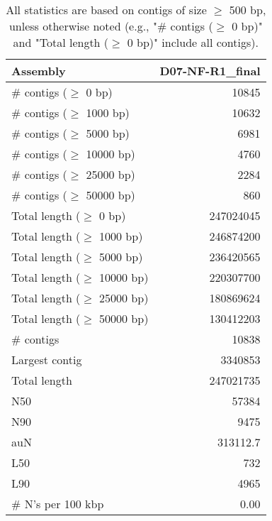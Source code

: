 \documentclass[12pt,a4paper]{article}
\begin{document}
\begin{table}[ht]
\begin{center}
\caption{All statistics are based on contigs of size $\geq$ 500 bp, unless otherwise noted (e.g., "\# contigs ($\geq$ 0 bp)" and "Total length ($\geq$ 0 bp)" include all contigs).}
\begin{tabular}{|l*{1}{|r}|}
\hline
Assembly & D07-NF-R1\_final \\ \hline
\# contigs ($\geq$ 0 bp) & 10845 \\ \hline
\# contigs ($\geq$ 1000 bp) & 10632 \\ \hline
\# contigs ($\geq$ 5000 bp) & 6981 \\ \hline
\# contigs ($\geq$ 10000 bp) & 4760 \\ \hline
\# contigs ($\geq$ 25000 bp) & 2284 \\ \hline
\# contigs ($\geq$ 50000 bp) & 860 \\ \hline
Total length ($\geq$ 0 bp) & 247024045 \\ \hline
Total length ($\geq$ 1000 bp) & 246874200 \\ \hline
Total length ($\geq$ 5000 bp) & 236420565 \\ \hline
Total length ($\geq$ 10000 bp) & 220307700 \\ \hline
Total length ($\geq$ 25000 bp) & 180869624 \\ \hline
Total length ($\geq$ 50000 bp) & 130412203 \\ \hline
\# contigs & 10838 \\ \hline
Largest contig & 3340853 \\ \hline
Total length & 247021735 \\ \hline
N50 & 57384 \\ \hline
N90 & 9475 \\ \hline
auN & 313112.7 \\ \hline
L50 & 732 \\ \hline
L90 & 4965 \\ \hline
\# N's per 100 kbp & 0.00 \\ \hline
\end{tabular}
\end{center}
\end{table}
\end{document}
